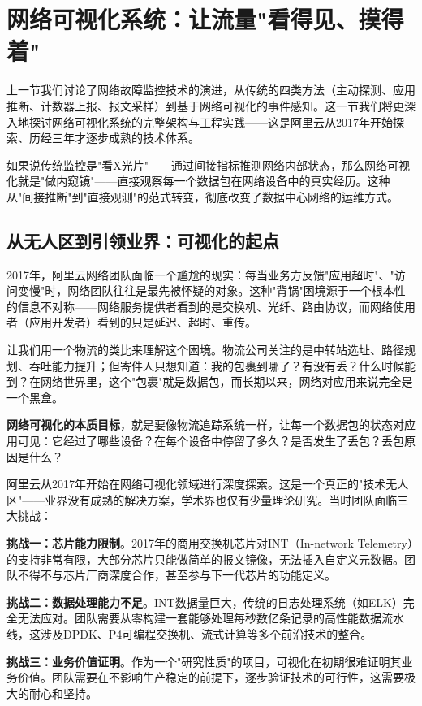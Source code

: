 \section{网络可视化系统：让流量"看得见、摸得着"}

上一节我们讨论了网络故障监控技术的演进，从传统的四类方法（主动探测、应用推断、计数器上报、报文采样）到基于网络可视化的事件感知。这一节我们将更深入地探讨网络可视化系统的完整架构与工程实践——这是阿里云从2017年开始探索、历经三年才逐步成熟的技术体系。

如果说传统监控是"看X光片"——通过间接指标推测网络内部状态，那么网络可视化就是"做内窥镜"——直接观察每一个数据包在网络设备中的真实经历。这种从"间接推断"到"直接观测"的范式转变，彻底改变了数据中心网络的运维方式。

\subsection{从无人区到引领业界：可视化的起点}

2017年，阿里云网络团队面临一个尴尬的现实：每当业务方反馈"应用超时"、"访问变慢"时，网络团队往往是最先被怀疑的对象。这种"背锅"困境源于一个根本性的信息不对称——网络服务提供者看到的是交换机、光纤、路由协议，而网络使用者（应用开发者）看到的只是延迟、超时、重传。

让我们用一个物流的类比来理解这个困境。物流公司关注的是中转站选址、路径规划、吞吐能力提升；但寄件人只想知道：我的包裹到哪了？有没有丢？什么时候能到？在网络世界里，这个"包裹"就是数据包，而长期以来，网络对应用来说完全是一个黑盒。

\textbf{网络可视化的本质目标}，就是要像物流追踪系统一样，让每一个数据包的状态对应用可见：它经过了哪些设备？在每个设备中停留了多久？是否发生了丢包？丢包原因是什么？

阿里云从2017年开始在网络可视化领域进行深度探索。这是一个真正的"技术无人区"——业界没有成熟的解决方案，学术界也仅有少量理论研究。当时团队面临三大挑战：

\textbf{挑战一：芯片能力限制}。2017年的商用交换机芯片对INT（In-network Telemetry）的支持非常有限，大部分芯片只能做简单的报文镜像，无法插入自定义元数据。团队不得不与芯片厂商深度合作，甚至参与下一代芯片的功能定义。

\textbf{挑战二：数据处理能力不足}。INT数据量巨大，传统的日志处理系统（如ELK）完全无法应对。团队需要从零构建一套能够处理每秒数亿条记录的高性能数据流水线，这涉及DPDK、P4可编程交换机、流式计算等多个前沿技术的整合。

\textbf{挑战三：业务价值证明}。作为一个"研究性质"的项目，可视化在初期很难证明其业务价值。团队需要在不影响生产稳定的前提下，逐步验证技术的可行性，这需要极大的耐心和坚持。

